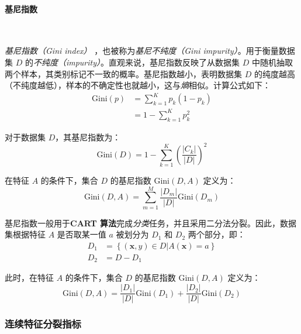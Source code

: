 \documentclass{ctexart}
\numberwithin{equation}{section}
\begin{document}
\paragraph{基尼指数}~{}

\emph{基尼指数（Gini index）} ，也被称为\emph{基尼不纯度（Gini impurity）}。用于衡量数据集 $D$ 的\emph{不纯度（impurity）}。直观来说，基尼指数反映了从数据集 $D$ 中随机抽取两个样本，其类别标记不一致的概率。基尼指数越小，表明数据集 $D$ 的纯度越高（不纯度越低），样本的不确定性也就越小，这与\emph{熵}相似。计算公式如下：
\begin{equation}
	\begin{split}
		\text{Gini}(p) &= \sum_{k=1}^K p_k (1 - p_k) \\
					   &= 1 - \sum_{k=1}^K p_k^2
	\end{split}
\end{equation}

对于数据集 $D$，其基尼指数为：
\begin{equation}
	\text{Gini}(D) = 1 - \sum_{k=1}^K \left( \frac{|C_k|}{|D|} \right)^2
\end{equation}

在特征 $A$ 的条件下，集合 $D$ 的基尼指数 $\text{Gini}(D,A)$ 定义为：
\begin{equation}
	\text{Gini}(D,A) = \sum_{m=1}^M \frac{|D_m|}{|D|} \text{Gini}(D_m)
\end{equation}

基尼指数一般用于\textbf{CART 算法}完成\emph{分类}任务，并且采用二分法分裂。因此，数据集根据特征 $A$ 是否取某一值 $a$ 被划分为 $D_1$ 和 $D_2$ 两个部分，即：
\begin{subequations}
	\begin{align}
		D_1 &= \left\{(\boldsymbol{x},y) \in D | A(\boldsymbol{x}) = a \right\} \\
		D_2 &= D - D_1
	\end{align}
\end{subequations}


此时，在特征 $A$ 的条件下，集合 $D$ 的基尼指数 $\text{Gini}(D,A)$ 定义为：
\begin{equation}
	\text{Gini}(D,A) = \frac{|D_1|}{|D|} \text{Gini}(D_1) + \frac{|D_2|}{|D|} \text{Gini}(D_2)
\end{equation}


\subsubsection{连续特征分裂指标}
\end{document}
